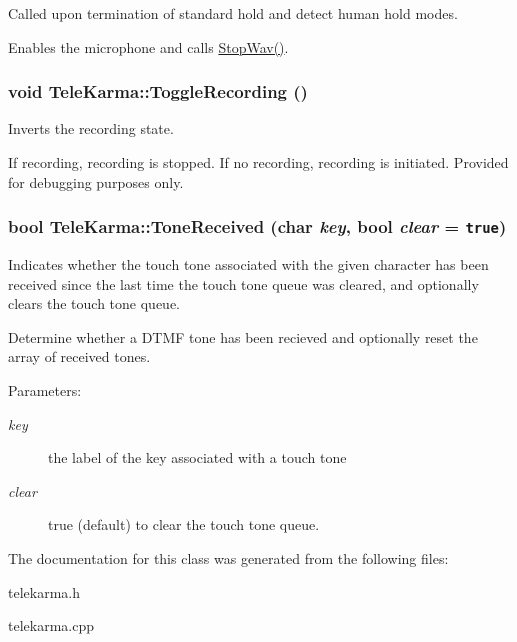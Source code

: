 Called upon termination of standard hold and detect human hold modes. 

Enables the microphone and calls \hyperlink{}{StopWav()}. \hypertarget{classTeleKarma_e5de07b5de99a85c3703be973e7230df}{
\subsubsection[{ToggleRecording}]{\setlength{\rightskip}{0pt plus 5cm}void TeleKarma::ToggleRecording ()}}
\label{classTeleKarma_e5de07b5de99a85c3703be973e7230df}


Inverts the recording state. 

If recording, recording is stopped. If no recording, recording is initiated. Provided for debugging purposes only. \hypertarget{classTeleKarma_2799e28d5e0736a0149c5a212b24e6c0}{
\subsubsection[{ToneReceived}]{\setlength{\rightskip}{0pt plus 5cm}bool TeleKarma::ToneReceived (char {\em key}, \/  bool {\em clear} = {\tt true})}}
\label{classTeleKarma_2799e28d5e0736a0149c5a212b24e6c0}


Indicates whether the touch tone associated with the given character has been received since the last time the touch tone queue was cleared, and optionally clears the touch tone queue. 

Determine whether a DTMF tone has been recieved and optionally reset the array of received tones.

\begin{Desc}
\item[Parameters:]
\begin{description}
\item[{\em key}]the label of the key associated with a touch tone \item[{\em clear}]true (default) to clear the touch tone queue. \end{description}
\end{Desc}


The documentation for this class was generated from the following files:\begin{CompactItemize}
\item 
telekarma.h\item 
telekarma.cpp\end{CompactItemize}
